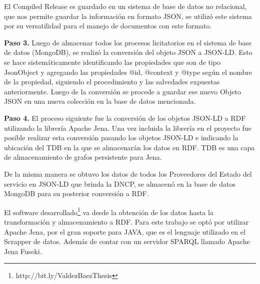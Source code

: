 El Compiled Release es guardado en un sistema de base de datos no relacional, que nos permite guardar la información en formato JSON, se utilizó este sistema por su versatilidad para el manejo de documentos con este formato.

\textbf{Paso 3.} Luego de almacenar todos los procesos licitatorios en el sistema de base de datos (MongoDB), se realizó la conversión del objeto JSON a JSON-LD. Esto se hace sistemáticamente identificando las propiedades que son de tipo JsonObject y agregando las propiedades @id, @context y @type según el nombre de la propiedad, siguiendo el procedimiento y las salvedades expuestas anteriormente. Luego de la conversión se procede a guardar ese nuevo Objeto JSON en una nueva colección en la base de datos mencionada.

\textbf{Paso 4.} El proceso siguiente fue la conversión de los objetos JSON-LD a RDF utilizando la librería Apache Jena. Una vez incluida la librería en el proyecto fue posible realizar esta conversión pasando los objetos JSON-LD e indicando la ubicación del TDB en la que se almacenarán los datos en RDF. TDB es una capa de almacenamiento de grafos persistente para Jena.

De la misma manera se obtuvo los datos de todos los Proveedores del Estado del servicio en JSON-LD que brinda la DNCP, se almacenó en la base de datos MongoDB para su posterior conversión a RDF. 

El software desarrollado\footnote{http://bit.ly/ValdezBaezThesis} va desde la obtención de los datos hasta la transformación y almacenamiento a RDF. Para este trabajo se optó por utilizar Apache Jena, por el gran soporte para JAVA, que es el lenguaje utilizado en el Scrapper de datos. Además de contar con un servidor SPARQL llamado Apache Jena Fuseki.



